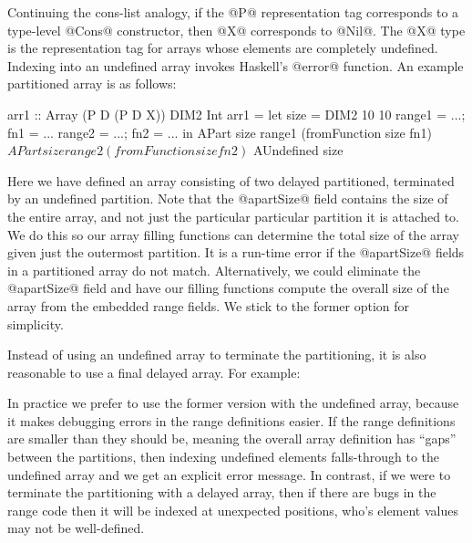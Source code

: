 Continuing the cons-list analogy, if the @P@ representation tag corresponds to a type-level @Cons@ constructor, then @X@ corresponds to @Nil@. The @X@ type is the representation tag for arrays whose elements are completely undefined. Indexing into an undefined array invokes Haskell's @error@ function. An example partitioned array is as follows:
\par
\begin{small}
\begin{code}
 arr1 :: Array (P D (P D X)) DIM2 Int
 arr1 = let size   = DIM2 10 10
           range1 = ...; fn1 = ...
           range2 = ...; fn2 = ...
       in  APart size range1 (fromFunction size fn1)
         $ APart size range2 (fromFunction size fn2)
         $ AUndefined size
\end{code}
\end{small}
\par
Here we have defined an array consisting of two delayed partitioned, terminated by an undefined partition. Note that the @apartSize@ field contains the size of the entire array, and not just the particular particular partition it is attached to. We do this so our array filling functions can determine the total size of the array given just the outermost partition. It is a run-time error if the @apartSize@ fields in a partitioned array do not match. Alternatively, we could eliminate the @apartSize@ field and have our filling functions compute the overall size of the array from the embedded range fields. We stick to the former option for simplicity. 

Instead of using an undefined array to terminate the partitioning, it is also reasonable to use a final delayed array. For example:
%
\begin{small}
\end{small}
%
In practice we prefer to use the former version with the undefined array, because it makes debugging errors in the range definitions easier. If the range definitions are smaller than they should be, meaning the overall array definition has ``gaps'' between the partitions, then indexing undefined elements falls-through to the undefined array and we get an explicit error message. In contrast, if we were to terminate the partitioning with a delayed array, then if there are bugs in the range code then it will be indexed at unexpected positions, who's element values may not be well-defined.


